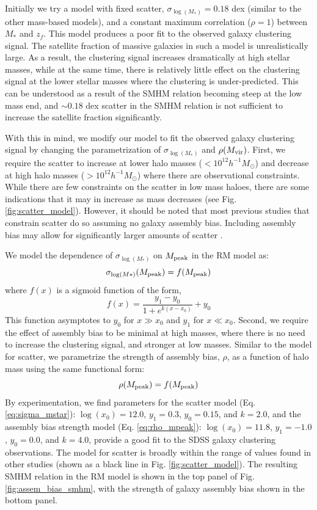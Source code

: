 \documentclass[useAMS,fleqn,usenatbib]{mnras}
\begin{document}
Initially we try a model with fixed scatter, $\sigma_{\log(M_*)} = 0.18$ dex (similar to the other mass-based models), and a constant maximum correlation ($\rho=1$) between $M_{*}$ and $z_f$. This model produces a poor fit to the observed galaxy clustering signal.  The satellite fraction of massive galaxies in such a model is unrealistically large.  As a result, the clustering signal increases dramatically at high stellar masses, while at the same time, there is relatively little effect on the clustering signal at the lower stellar masses where the clustering is under-predicted.  This can be understood as a result of the SMHM relation becoming steep at the low mass end, and $\sim 0.18$ dex scatter in the SMHM relation is not sufficient to increase the satellite fraction significantly.

With this in mind, we modify our model to fit the observed galaxy clustering signal by changing the parametrization of $\sigma_{\log(M_*)}$ and $\rho(M_{\rm vir})$.  First, we require the scatter to increase at lower halo masses ($<10^{12}h^{-1}M_{\odot}$) and decrease at high halo masses ($>10^{12}h^{-1}M_{\odot}$) where there are observational constraints.  While there are few constraints on the scatter in low mass haloes, there are some indications that it may in increase as mass decreases (see Fig. \ref{fig:scatter_model}). However, it should be noted that most previous studies that constrain scatter do so assuming no galaxy assembly bias. Including assembly bias may allow for significantly larger amounts of scatter \citep{Zentner:2014ki, Zentner:2016tz}.  

We model the dependence of $\sigma_{\log(M_*)}$ on $M_{\rm peak}$ in the RM model as:
%
\begin{equation}
\label{eq:sigma_mstar}
\sigma_{\log(M*)}(M_{\rm peak}) = f(M_{\rm peak})
\end{equation}
%
where $f(x)$ is a sigmoid function of the form,
%
\begin{equation}
f(x) = \frac{y_1 - y_0}{1+ e^{k(x-x_0)}} + y_0
\end{equation}
%
This function asymptotes to $y_0$ for $x \gg x_0$ and $y_1$ for $x \ll x_0$.  Second, we require the effect of assembly bias to be minimal at high masses, where there is no need to increase the clustering signal, and stronger at low masses.  Similar to the model for scatter, we parametrize the strength of assembly bias, $\rho$, as a function of halo mass using the same functional form:
%
\begin{equation}
\label{eq:rho_mpeak}
\rho(M_{\rm peak}) = f(M_{\rm peak})
\end{equation}
%
By experimentation, we find parameters for the scatter model (Eq. \ref{eq:sigma_mstar}): $\log(x_{0})=12.0$, $y_1=0.3$, $y_0=0.15$, and $k=2.0$, and the assembly bias strength model (Eq. \ref{eq:rho_mpeak}): $\log(x_{0})=11.8$, $y_1=-1.0$, $y_0=0.0$, and $k=4.0$, provide a good fit to the SDSS galaxy clustering observations.  The model for scatter is broadly within the range of values found in other studies (shown as a black line in Fig. \ref{fig:scatter_model}).  The resulting SMHM relation in the RM model is shown in the top panel of Fig. \ref{fig:assem_bias_smhm}, with the strength of galaxy assembly bias shown in the bottom panel.  
\end{document}
